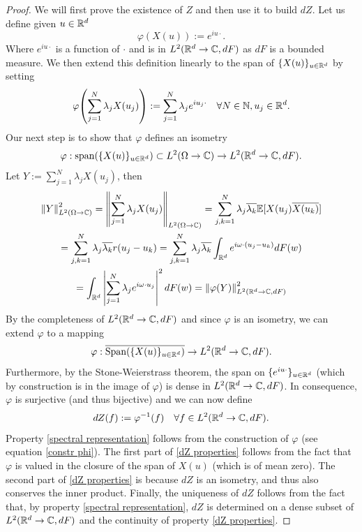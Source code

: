 \documentclass[
    a4paper,
    DIV=14,
    abstract=true,
    numbers=noenddot
]{scrartcl}
\begin{document}
\begin{proof}
	We will first prove the existence of $Z$ and then use it to build $dZ$. Let us define given $u\in\mathbb{R}^d$
	\begin{equation}\label{constr phi}
		\varphi(X(u)):=e^{iu\cdot}.
	\end{equation}
	Where $e^{iu\cdot}$ is a function of $\cdot$ and is in $L^2(\mathbb{R}^d\to\mathbb{C},dF)$ as $dF$ is a bounded measure. We then extend this definition linearly to the span of $\{X(u)\}_{u\in\mathbb{R}^d}$ by setting
	\begin{equation*}
		\varphi\qty(\sum_{j=1}^N\lambda_j X(u_j)):=\sum_{j=1}^N\lambda_j e^{iu_j\cdot}\quad\forall N\in \mathbb{N},u_j\in\mathbb{R}^d.
	\end{equation*}
	Our next step is to show that $\varphi$ defines an isometry $$\varphi:\text{span}(\{X(u)\}_{u\in\mathbb{R}^d})\subset L^2(\Omega\to\mathbb{C})\to L^2(\mathbb{R}^d\to\mathbb{C},dF).$$
	Let $Y:=\sum_{j=1}^N\lambda_j X(u_j)$, then
	\begin{multline*}
		\left\lVert Y \right\rVert_{L^2(\Omega\to\mathbb{C})}^2=\left\lVert \sum_{j=1}^N\lambda_j X(u_j) \right\rVert_{L^2(\Omega\to\mathbb{C})}=\sum_{j,k=1}^N\lambda_j\overline{\lambda_k} \mathbb{E}[X(u_j)\overline{X(u_k)}]\\=\sum_{j,k=1}^N\lambda_j\overline{\lambda_k} r(u_j-u_k)
		=\sum_{j,k=1}^N\lambda_j\overline{\lambda_k} \int_{\mathbb{R}^d}e^{i\omega\cdot(u_j-u_k)}dF(w) \\= \int_{\mathbb{R}^d}\left| \sum_{j=1}^N\lambda_je^{i\omega\cdot u_j} \right|^2dF(w)=\left\lVert \varphi(Y) \right\rVert_{L^2(\mathbb{R}^d\to\mathbb{C},dF)}^2
	\end{multline*}
	By the completeness of $L^2(\mathbb{R}^d\to\mathbb{C}, dF)$ and since $\varphi$ is an isometry, we can extend $\varphi$ to a mapping
	$$\varphi:\overline{\text{Span}(\{X(u)\}_{u\in\mathbb{R}^d})}\to L^2(\mathbb{R}^d\to\mathbb{C},dF).$$ Furthermore, by the Stone-Weierstrass theorem, the span on $\{e^{iu\cdot}\}_{u\in\mathbb{R}^d}$ (which by construction is in the image of $\varphi$) is dense in $L^2(\mathbb{R}^d\to\mathbb{C},dF)$. In consequence,  $\varphi$ is surjective (and thus bijective) and we can now define
	\begin{equation*}
		dZ(f):=\varphi^{-1}(f)\quad\forall f\in L^2(\mathbb{R}^d\to\mathbb{C},dF).
	\end{equation*}
	Property \eqref{spectral representation} follows from the construction of $\varphi$ (see equation \eqref{constr phi}). The first part of \eqref{dZ properties} follows from the fact that $\varphi$ is valued in the closure of the span of $X(u)$ (which is of mean zero). The second part of \eqref{dZ properties} is because $dZ$ is an isometry, and thus also conserves the inner product. Finally, the uniqueness of $dZ$ follows from the fact that, by property \eqref{spectral representation}, $dZ$ is determined on a dense subset of $L^2(\mathbb{R}^d\to\mathbb{C},dF)$ and the continuity of property \eqref{dZ properties}.
\end{proof}
\end{document}
